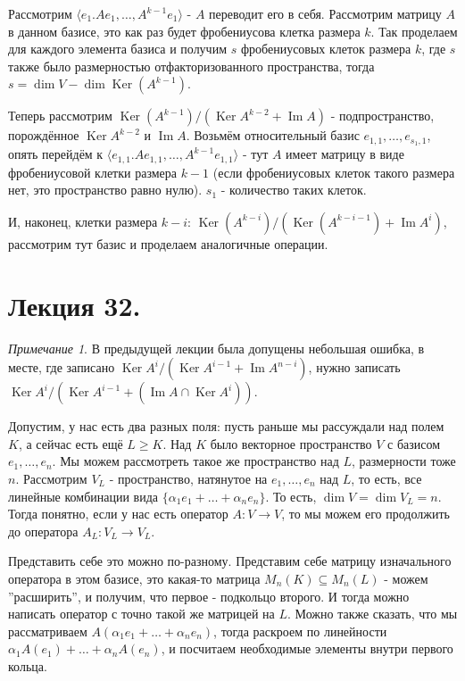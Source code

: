 \documentclass[a4paper,100pt]{article}
\theoremstyle{indented}
\theoremstyle{definition}
\theoremstyle{remark}
\newtheorem{remark}{Примечание}
\DeclareMathOperator{\Ker}{Ker}
\DeclareMathOperator{\Imf}{Im}
\begin{document}
Рассмотрим $\langle e_1. Ae_1, \ldots, A^{k-1}e_1\rangle$ - $A$ переводит его в себя. Рассмотрим матрицу $A$ в данном базисе, это как раз будет фробениусова клетка размера $k$. Так проделаем для каждого элемента базиса и получим $s$ фробениусовых клеток размера $k$, где $s$ также было размерностью отфакторизованного пространства, тогда $s=\dim V-\dim \Ker (A^{k-1})$. \ 

Теперь рассмотрим $\Ker(A^{k-1})/(\Ker A^{k-2}+\Imf A)$ -  подпространство, порождённое $\Ker A^{k-2}$ и $\Imf A$. Возьмём относительный базис $e_{1, 1}, \ldots, e_{s_1, 1}$, опять перейдём к $\langle e_{1, 1}. Ae_{1, 1}, \ldots, A^{k-1}e_{1, 1}\rangle$ - тут $A$ имеет матрицу в виде фробениусовой клетки размера $k-1$ (если фробениусовых клеток такого размера нет, это пространство равно нулю). $s_1$ - количество таких клеток. \ 

И, наконец, клетки размера $k-i$: $\Ker(A^{k-i})/(\Ker(A^{k-i-1})+\Imf A^i)$, рассмотрим тут базис и проделаем аналогичные операции. \ 


\section{Лекция 32.}


\begin{remark}
    В предыдущей лекции была допущены небольшая ошибка, в месте, где записано $\Ker A^i/(\Ker A^{i-1}+\Imf A^{n-i})$, нужно записать $\Ker A^i/(\Ker A^{i-1}+(\Imf A\cap \Ker A^i))$.
\end{remark}

Допустим, у нас есть два разных поля: пусть раньше мы рассуждали над полем $K$, а сейчас есть ещё $L\geq K$. Над $K$ было векторное пространство $V$ с базисом $e_1, \ldots, e_n$. Мы можем рассмотреть такое же пространство над $L$, размерности тоже $n$. Рассмотрим $V_L$ - пространство, натянутое на $e_1, \ldots, e_n$ над $L$, то есть, все линейные комбинации вида $\{\alpha_1e_1+\ldots+\alpha_ne_n\}$. То есть, $\dim V = \dim V_L = n$. Тогда понятно, если у нас есть оператор $A: V\rightarrow V$, то мы можем его продолжить до оператора $A_L:V_L\rightarrow V_L$. \ 

Представить себе это можно по-разному. Представим себе матрицу изначального оператора в этом базисе, это какая-то матрица $M_n(K)\subseteq M_n(L)$ - можем ''расширить'', и получим, что первое - подкольцо второго. И тогда можно написать оператор с точно такой же матрицей на $L$. Можно также сказать, что мы рассматриваем $A(\alpha_1e_1+\ldots+\alpha_ne_n)$, тогда раскроем по линейности $\alpha_1A(e_1)+\ldots+\alpha_nA(e_n)$, и посчитаем необходимые элементы внутри первого кольца. \ 
\end{document}
